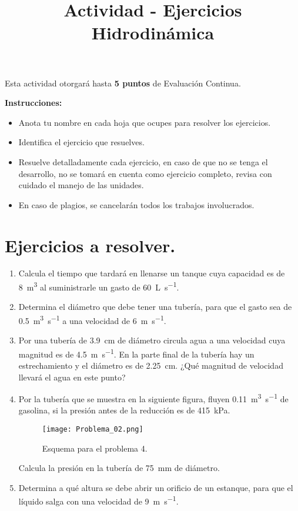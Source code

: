 \documentclass[14pt]{extarticle}
\title{\vspace*{-2cm} Actividad - Ejercicios Hidrodinámica \vspace{-5ex}}
\date{}
\begin{document}
\maketitle

Esta actividad otorgará hasta \textbf{5 puntos} de Evaluación Continua.
\vspace*{0.5cm}

\textbf{Instrucciones: }
\begin{itemize}
\item Anota tu nombre en cada hoja que ocupes para resolver los ejercicios.
\item Identifica el ejercicio que resuelves.
\item Resuelve detalladamente cada ejercicio, en caso de que no se tenga el desarrollo, no se tomará en cuenta como ejercicio completo, revisa con cuidado el manejo de las unidades.
\item En caso de plagios, se cancelarán todos los trabajos involucrados.
\end{itemize}


\section*{Ejercicios a resolver.}

\begin{enumerate}
\item Calcula el tiempo que tardará en llenarse un tanque cuya capacidad es de \SI{8}{\cubic\meter} al suministrarle un gasto de \SI{60}{\liter\per\second}.
\item Determina el diámetro que debe tener una tubería, para que el gasto sea de \SI{0.5}{\cubic\meter\per\second} a una velocidad de \SI{6}{\meter\per\second}.
\item Por una tubería de \SI{3.9}{\centi\meter} de diámetro circula agua a una velocidad cuya magnitud es de \SI{4.5}{\meter\per\second}. En la parte final de la tubería hay un estrechamiento y el diámetro es de \SI{2.25}{\centi\meter}. ¿Qué magnitud de velocidad llevará el agua en este punto?
\item Por la tubería que se muestra en la siguiente figura, fluyen \SI{0.11}{\cubic\meter\per\second} de gasolina, si la presión antes de la reducción es de \SI{415}{\kilo\pascal}.
\begin{figure}[H]
    \centering
    \texttt{[image: Problema\_02.png]}
    \caption{Esquema para el problema 4.}
\end{figure}
Calcula la presión en la tubería de \SI{75}{\milli\meter} de diámetro.
\item Determina a qué altura se debe abrir un orificio de un estanque, para que el líquido salga con una velocidad de \SI{9}{\meter\per\second}.
\end{enumerate}
\end{document}
